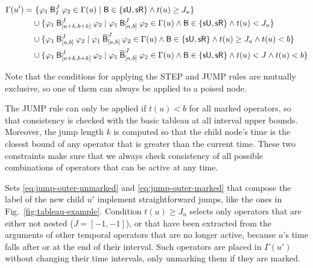 \documentclass[acmsmall,screen]{acmart}
\begin{document}
\begin{description}
\begin{align}
\Gamma(u') =
&\ \set{\anybinop[J]{I}{\varphi_1}{\varphi_2} \in \Gamma(u) \mid \mathsf{B} \in \set{\suntilop, \sreleaseop} \land t(u) \geq J_u} \label{eq:jump-outer-unmarked} \\
&\cup
\set{\anybinop[J]{[a+k, b+k]}{\varphi_1}{\varphi_2} \mid \anybinop[J]{[a,b]}{\varphi_1}{\varphi_2} \in \Gamma(u) \land \mathsf{B} \in \set{\suntilop, \sreleaseop} \land t(u) < J_u} \label{eq:jump-derived-unmarked} \\
&\cup
\set{\anybinop[J]{[a,b]}{\varphi_1}{\varphi_2} \mid \stlbinop[J]{\marked{\mathsf{B}}}{[a,b]}{\varphi_1}{\varphi_2} \in \Gamma(u) \land \mathsf{B} \in \set{\suntilop, \sreleaseop} \land t(u) \geq J_u \land t(u) < b} \label{eq:jump-outer-marked} \\
&\cup
\set{\anybinop[J]{[a+k,b+k]}{\varphi_1}{\varphi_2} \mid \stlbinop[J]{\marked{\mathsf{B}}}{[a,b]}{\varphi_1}{\varphi_2} \in \Gamma(u) \land \mathsf{B} \in \set{\suntilop, \sreleaseop} \land t(u) < J \land t(u) < b} \label{eq:jump-derived-marked}
\end{align}
\end{description}
Note that the conditions for applying the \textsf{STEP} and \textsf{JUMP} rules are mutually exclusive,
so one of them can always be applied to a poised node.

The \textsf{JUMP} rule can only be applied if $t(u) < b$ for all marked operators,
so that consistency is checked with the basic tableau at all interval upper bounds.
Moreover, the jump length $k$ is computed so that the child node's time is the closest
bound of any operator that is greater than the current time.
These two constraints make sure that we always check consistency of all possible combinations of operators that can be active at any time.

Sets \eqref{eq:jump-outer-unmarked} and \eqref{eq:jump-outer-marked}
that compose the label of the new child $u'$ implement straightforward jumps,
like the ones in Fig.~\ref{fig:tableau-example}.
Condition $t(u) \geq J_u$ selects only operators that are either not nested ($J = [-1,-1]$),
or that have been extracted from the arguments of other temporal operators
that are no longer active, because $u$'s time falls after or at the end of their interval.
Such operators are placed in $\Gamma(u')$ without changing their time intervals,
only unmarking them if they are marked.
\end{document}
